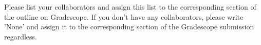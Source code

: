 Please list your collaborators and assign this list to the corresponding section of the outline on Gradescope. If you don't have any collaborators, please write 'None' and assign it to the corresponding section of the Gradescope submission regardless.